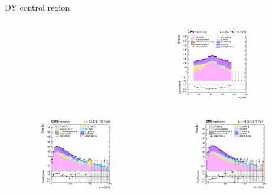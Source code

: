 \documentclass[8pt]{beamer}
\begin{document}
\begin{frame}{DY control region}
\begin{columns}
\begin{column}{0.33\textwidth}
\begin{center}
    		\end{center}		
		\end{column} 
		\begin{column}{0.33\textwidth}
			\begin{center}
			\vspace{-8pt}
			\begin{block}{}\end{block}\vspace{5pt}
     			\includegraphics[width=1.0\textwidth, height=90pt]{figs/2018/log_cratio_dyCR_ll_mllpeak.png}
    		\end{center}		
		\end{column}
\end{columns}
\vspace{-10pt}
\begin{columns}
		\begin{column}{0.33\textwidth}
			\begin{center}
     			\includegraphics[width=1.0\textwidth, height=90pt]{figs/2016/log_cratio_dyCR_ll_METcorrected_pt.png}
    		\end{center}		
		\end{column}
		\begin{column}{0.33\textwidth}
			\begin{center}
     			\includegraphics[width=1.0\textwidth, height=90pt]{figs/2017/log_cratio_dyCR_ll_METcorrected_pt.png}

\end{center}
\end{column}
\end{columns}
\end{frame}
\end{document}
